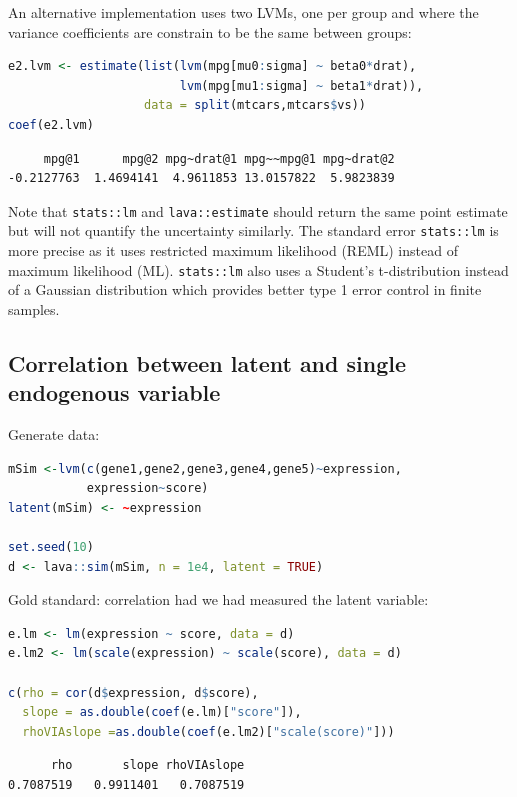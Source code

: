 \documentclass{article}
\begin{document}
An alternative implementation uses two LVMs, one per group and where
the variance coefficients are constrain to be the same between groups:
\begin{lstlisting}[language=r,numbers=none]
e2.lvm <- estimate(list(lvm(mpg[mu0:sigma] ~ beta0*drat),
                        lvm(mpg[mu1:sigma] ~ beta1*drat)),
                   data = split(mtcars,mtcars$vs))
coef(e2.lvm)
\end{lstlisting}

\label{}
\begin{verbatim}
     mpg@1      mpg@2 mpg~drat@1 mpg~~mpg@1 mpg~drat@2 
-0.2127763  1.4694141  4.9611853 13.0157822  5.9823839
\end{verbatim}


Note that \texttt{stats::lm} and \texttt{lava::estimate} should return the same
point estimate but will not quantify the uncertainty similarly. The
standard error \texttt{stats::lm} is more precise as it uses restricted
maximum likelihood (REML) instead of maximum likelihood
(ML). \texttt{stats::lm} also uses a Student's t-distribution instead of a
Gaussian distribution which provides better type 1 error control in
finite samples. 
\subsection{Correlation between latent and single endogenous variable}
\label{sec:org6e579f4}

Generate data:
\begin{lstlisting}[language=r,numbers=none]
mSim <-lvm(c(gene1,gene2,gene3,gene4,gene5)~expression,
           expression~score)
latent(mSim) <- ~expression

set.seed(10)
d <- lava::sim(mSim, n = 1e4, latent = TRUE)
\end{lstlisting}

Gold standard: correlation had we had measured the latent variable:
\begin{lstlisting}[language=r,numbers=none]
e.lm <- lm(expression ~ score, data = d)
e.lm2 <- lm(scale(expression) ~ scale(score), data = d)

c(rho = cor(d$expression, d$score),  
  slope = as.double(coef(e.lm)["score"]),
  rhoVIAslope =as.double(coef(e.lm2)["scale(score)"]))
\end{lstlisting}

\label{}
\begin{verbatim}
      rho       slope rhoVIAslope 
0.7087519   0.9911401   0.7087519
\end{verbatim}
\end{document}
